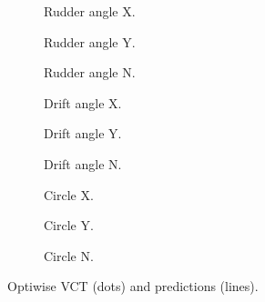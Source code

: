 \begin{figure}[h]
    \centering
    \begin{subfigure}[b]{0.32\textwidth}
         \centering
         
        \caption{Rudder angle X.}
        \label{fig:rudder_angle_X_optiwise}
    \end{subfigure}
    \hfill
    \begin{subfigure}[b]{0.32\textwidth}
        \centering
        
       \caption{Rudder angle Y.}
       \label{fig:rudder_angle_Y_optiwise}
    \end{subfigure}
    \hfill
    \begin{subfigure}[b]{0.32\textwidth}
        \centering
        
       \caption{Rudder angle N.}
       \label{fig:rudder_angle_N_optiwise}
    \end{subfigure}

    \vfill
    \begin{subfigure}[b]{0.32\textwidth}
        \centering
        
       \caption{Drift angle X.}
       \label{fig:drift_angle_X_optiwise}
    \end{subfigure}
    \hfill
    \begin{subfigure}[b]{0.32\textwidth}
        \centering
        
       \caption{Drift angle Y.}
       \label{fig:drift_angle_Y_optiwise}
    \end{subfigure}
    \hfill
    \begin{subfigure}[b]{0.32\textwidth}
        \centering
        
       \caption{Drift angle N.}
       \label{fig:drift_angle_N_optiwise}
    \end{subfigure}
    
    \vfill
    \begin{subfigure}[b]{0.32\textwidth}
        \centering
        
       \caption{Circle X.}
       \label{fig:circle_X_optiwise}
    \end{subfigure}
    \hfill
    \begin{subfigure}[b]{0.32\textwidth}
        \centering
        
       \caption{Circle Y.}
       \label{fig:circle_Y_optiwise}
    \end{subfigure}
    \hfill
    \begin{subfigure}[b]{0.32\textwidth}
        \centering
        
       \caption{Circle N.}
       \label{fig:circle_N_optiwise}
    \end{subfigure}
    
    \caption{Optiwise VCT (dots) and predictions (lines).}
    \label{fig:VCT_optiwise}
\end{figure}

